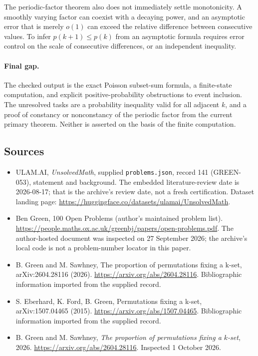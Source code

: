 \documentclass[11pt,a4paper]{article}
\begin{document}
The periodic-factor theorem also does not immediately settle monotonicity. A smoothly varying factor can coexist with a decaying power, and an asymptotic error that is merely $o(1)$ can exceed the relative difference between consecutive values. To infer $p(k+1)\leq p(k)$ from an asymptotic formula requires error control on the scale of consecutive differences, or an independent inequality.

\paragraph{Final gap.}
The checked output is the exact Poisson subset-sum formula, a finite-state computation, and explicit positive-probability obstructions to event inclusion. The unresolved tasks are a probability inequality valid for all adjacent $k$, and a proof of constancy or nonconstancy of the periodic factor from the current primary theorem. Neither is asserted on the basis of the finite computation.

\subsection{Sources}

{\small

\begin{itemize}

\item[\hypertarget{source:141:1}{S1}] ULAM.AI, \emph{UnsolvedMath}, supplied \texttt{problems.json}, record 141 (GREEN-053), statement and background. The embedded literature-review date is 2026-08-17; that is the archive’s review date, not a fresh certification. Dataset landing page: \url{https://huggingface.co/datasets/ulamai/UnsolvedMath}.

\item[\hypertarget{source:141:2}{S2}] Ben Green, 100 Open Problems (author’s maintained problem list). \url{https://people.maths.ox.ac.uk/greenbj/papers/open-problems.pdf}. The author-hosted document was inspected on 27 September 2026; the archive’s local code is not a problem-number locator in this paper.

\item[\hypertarget{source:141:3}{S3}] B. Green and M. Sawhney, The proportion of permutations fixing a k-set, arXiv:2604.28116 (2026). \url{https://arxiv.org/abs/2604.28116}. Bibliographic information imported from the supplied record.

\item[\hypertarget{source:141:4}{S4}] S. Eberhard, K. Ford, B. Green, Permutations fixing a k-set, arXiv:1507.04465 (2015). \url{https://arxiv.org/abs/1507.04465}. Bibliographic information imported from the supplied record.

\item[E1] B. Green and M. Sawhney, \emph{The proportion of permutations fixing a $k$-set}, 2026. \url{https://arxiv.org/abs/2604.28116}. Inspected 1 October 2026.

\end{itemize}

}

\label{end:141}
\end{document}
